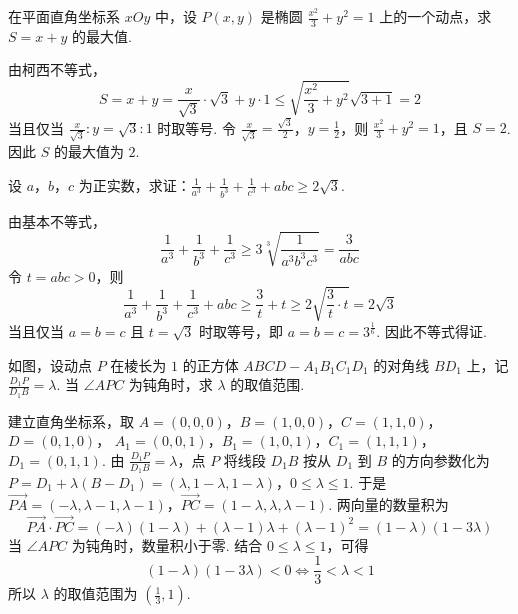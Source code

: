 \reuseproblemnumber
\begin{problem}[C]
在平面直角坐标系 \(xOy\) 中，设 \(P(x, y)\) 是椭圆 \(\frac{x^2}{3} + y^2 = 1\) 上的一个动点，求 \(S = x + y\) 的最大值.
\end{problem}

\begin{solution}
由柯西不等式，
\[
S=x+y=\frac{x}{\sqrt{3}}\cdot\sqrt{3}+y\cdot1\leqslant\sqrt{\frac{x^2}{3}+y^2}\sqrt{3+1}=2
\]
当且仅当 \(\frac{x}{\sqrt{3}}:y=\sqrt{3}:1\) 时取等号. 令 \(\frac{x}{\sqrt{3}}=\frac{\sqrt{3}}{2}\)，\(y=\frac{1}{2}\)，则 \(\frac{x^2}{3}+y^2=1\)，且 \(S=2\). 因此 \(S\) 的最大值为 \(2\).
\end{solution}

\reuseproblemnumber
\begin{problem}[D]
设 \(a\)，\(b\)，\(c\) 为正实数，求证：\(\frac{1}{a^3} + \frac{1}{b^3} + \frac{1}{c^3} + abc \geqslant 2\sqrt{3}\).
\end{problem}

\begin{solution}
由基本不等式，
\[
\frac{1}{a^3}+\frac{1}{b^3}+\frac{1}{c^3}\geqslant3\sqrt[3]{\frac{1}{a^3b^3c^3}}=\frac{3}{abc}
\]
令 \(t=abc>0\)，则
\[
\frac{1}{a^3}+\frac{1}{b^3}+\frac{1}{c^3}+abc\geqslant\frac{3}{t}+t\geqslant2\sqrt{\frac{3}{t}\cdot t}=2\sqrt{3}
\]
当且仅当 \(a=b=c\) 且 \(t=\sqrt{3}\) 时取等号，即 \(a=b=c=3^{\frac{1}{6}}\). 因此不等式得证.
\end{solution}



\begin{problem}
如图，设动点 \(P\) 在棱长为 \(1\) 的正方体 \(ABCD - A_1B_1C_1D_1\) 的对角线 \(BD_1\) 上，记 \(\frac{D_1P}{D_1B} = \lambda\). 当 \(\angle APC\) 为钝角时，求 \(\lambda\) 的取值范围.

\end{problem}

\begin{solution}
建立直角坐标系，取
\(A=(0,0,0)\)，\(B=(1,0,0)\)，\(C=(1,1,0)\)，\(D=(0,1,0)\)，
\(A_1=(0,0,1)\)，\(B_1=(1,0,1)\)，\(C_1=(1,1,1)\)，\(D_1=(0,1,1)\).
由 \(\frac{D_1P}{D_1B}=\lambda\)，点 \(P\) 将线段 \(D_1B\) 按从 \(D_1\) 到 \(B\) 的方向参数化为
\(P=D_1+\lambda(B-D_1)=(\lambda,1-\lambda,1-\lambda)\)，\(0\leqslant\lambda\leqslant1\).
于是
\(\overrightarrow{PA}=(-\lambda,\lambda-1,\lambda-1)\)，\(\overrightarrow{PC}=(1-\lambda,\lambda,\lambda-1)\).
两向量的数量积为
\[
\overrightarrow{PA}\cdot\overrightarrow{PC}=(-\lambda)(1-\lambda)+(\lambda-1)\lambda+(\lambda-1)^2=(1-\lambda)(1-3\lambda)
\]
当 \(\angle APC\) 为钝角时，数量积小于零. 结合 \(0\leqslant\lambda\leqslant1\)，可得
\[
(1-\lambda)(1-3\lambda)<0\Longleftrightarrow\frac{1}{3}<\lambda<1
\]
所以 \(\lambda\) 的取值范围为 \(\left(\frac{1}{3},1\right)\).
\end{solution}

